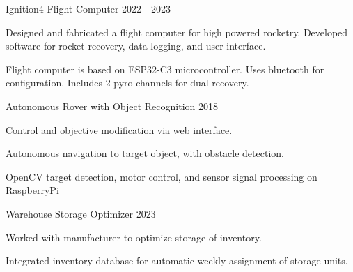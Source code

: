 

\begin{cventries}

\cventry
  {Ignition4 Flight Computer} %
  {} %
  {} %
  {2022 - 2023} %
  {
    \begin{cvitems} %
      \item {Designed and fabricated a flight computer for high powered rocketry. Developed software for rocket recovery, data logging, and user interface. }
      \item {Flight computer is based on ESP32-C3 microcontroller. Uses bluetooth for configuration. Includes 2 pyro channels for dual recovery.}
    \end{cvitems}
  }


  \cventry
    {Autonomous Rover with Object Recognition} %
    {} %
    {} %
    {2018} %
    {
      \begin{cvitems} %
        \item {Control and objective modification via web interface.}
        \item {Autonomous navigation to target object, with obstacle detection.}
        \item {OpenCV target detection, motor control, and sensor signal processing on RaspberryPi}
      \end{cvitems}
    }

  \cventry
  {Warehouse Storage Optimizer} %
  {} %
  {} %
  {2023} %
  {
    \begin{cvitems} %
      \item {Worked with manufacturer to optimize storage of inventory.}
      \item {Integrated inventory database for automatic weekly assignment of storage units.}
    \end{cvitems}
  }


\end{cventries}
